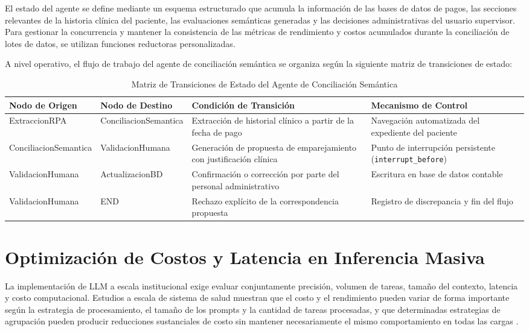 El estado del agente se define mediante un esquema estructurado que acumula la información de las bases de datos de pagos, las secciones relevantes de la historia clínica del paciente, las evaluaciones semánticas generadas y las decisiones administrativas del usuario supervisor. Para gestionar la concurrencia y mantener la consistencia de las métricas de rendimiento y costos acumulados durante la conciliación de lotes de datos, se utilizan funciones reductoras personalizadas.

A nivel operativo, el flujo de trabajo del agente de conciliación semántica se organiza según la siguiente matriz de transiciones de estado:

\begin{table}[h!]
\centering
\small
\begin{tabular}{|p{3cm}|p{3cm}|p{4cm}|p{4cm}|}
\hline
\textbf{Nodo de Origen} & \textbf{Nodo de Destino} & \textbf{Condición de Transición} & \textbf{Mecanismo de Control} \\ \hline
ExtraccionRPA & ConciliacionSemantica & Extracción de historial clínico a partir de la fecha de pago & Navegación automatizada del expediente del paciente \\ \hline
ConciliacionSemantica & ValidacionHumana & Generación de propuesta de emparejamiento con justificación clínica & Punto de interrupción persistente (\texttt{interrupt\_before}) \\ \hline
ValidacionHumana & ActualizacionBD & Confirmación o corrección por parte del personal administrativo & Escritura en base de datos contable \\ \hline
ValidacionHumana & END & Rechazo explícito de la correspondencia propuesta & Registro de discrepancia y fin del flujo \\ \hline
\end{tabular}
\caption{Matriz de Transiciones de Estado del Agente de Conciliación Semántica}
\label{tab:transiciones_estado}
\end{table}

\section{Optimización de Costos y Latencia en Inferencia Masiva}

La implementación de LLM a escala institucional exige evaluar conjuntamente precisión, volumen de tareas, tamaño del contexto, latencia y costo computacional. Estudios a escala de sistema de salud muestran que el costo y el rendimiento pueden variar de forma importante según la estrategia de procesamiento, el tamaño de los prompts y la cantidad de tareas procesadas, y que determinadas estrategias de agrupación pueden producir reducciones sustanciales de costo sin mantener necesariamente el mismo comportamiento en todas las cargas \cite{klang2024cost}.


